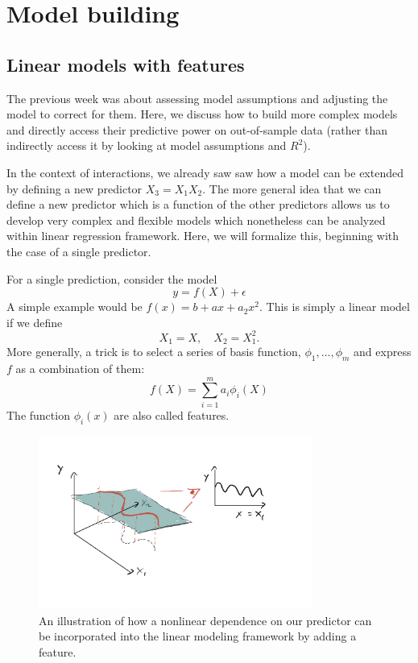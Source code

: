 \chapter{Model building}



\section{Linear models with features}
The previous week was about assessing model assumptions and adjusting the model to correct for them. Here, we discuss how to build more complex models and directly access their predictive power on out-of-sample data (rather than indirectly access it by looking at model assumptions and $R^2$).



In the context of interactions, we already saw saw how a model can be extended by defining a new predictor $X_3 = X_1X_2$. The more general idea that we can define a new predictor which is a function of the other predictors allows us to develop very complex and flexible models which nonetheless can be analyzed within linear regression framework. Here, we will formalize this, beginning with the case of a single predictor. 

  For a single prediction, consider the model
\begin{equation}
y = f(X) + \epsilon 
\end{equation}
A simple example would be $f(x) = b+ax + a_2x^2$. This is simply a linear model if we define 
\begin{equation}
X_1 = X,\quad X_2 = X_1^2. 
\end{equation}
More generally, a trick is to select a series of {\dfn basis} function, $\phi_1,\dots,\phi_m$ and express $f$ as a combination of them: 
\begin{equation}
f(X) = \sum_{i=1}^m a_i\phi_i(X)
\end{equation}
The function $\phi_i(x)$ are also called {\dfn features}. 

\begin{figure}[h]
    \centering
    \includegraphics[width=0.8\textwidth]{feature}
    \caption{An illustration of how a nonlinear dependence on our predictor can be incorporated into the linear modeling framework by adding a feature.}
    \label{fig:feature}
\end{figure}

